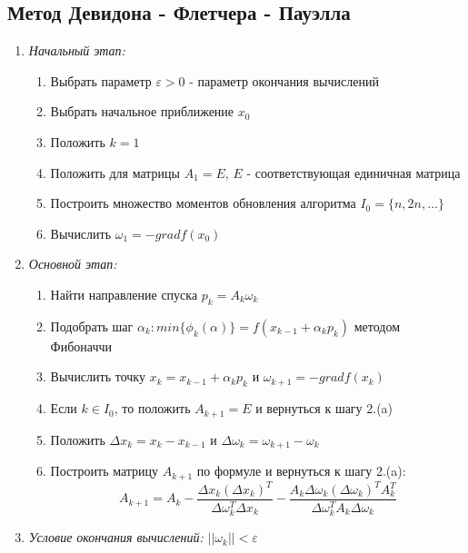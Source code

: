 \documentclass[../body.tex]{subfiles}
\begin{document}
\subsection{Метод Девидона - Флетчера - Пауэлла}
\begin{enumerate}
    \item \textit{Начальный этап:}
        \begin{enumerate}
            \item Выбрать параметр $\varepsilon>0$ - параметр окончания вычислений
            \item Выбрать начальное приближение $x_0$
            \item Положить $k=1$
            \item Положить для матрицы $A_1=E$, $E$ - соответствующая единичная матрица
            \item Построить множество моментов обновления алгоритма $I_0=\{n,2n,...\}$
            \item Вычислить $\omega_1=-grad f(x_0)$
        \end{enumerate}
    \item \textit{Основной этап:}
        \begin{enumerate}
            \item Найти направление спуска $p_k=A_k\omega_k$
            \item Подобрать шаг $\alpha_k:min{\{\phi_k(\alpha)\}}=f(x_{k-1}+\alpha_k p_k)$ методом Фибоначчи
            \item Вычислить точку $x_k=x_{k-1}+\alpha_k p_k$ и $\omega_{k+1}=-grad f(x_k)$
            \item Если $k\in I_0$, то положить $A_{k+1}=E$ и вернуться к шагу 2.(a)
            \item Положить $\Delta x_k=x_k-x_{k-1}$ и $\Delta\omega_k=\omega_{k+1}-\omega_k$
            \item Построить матрицу $A_{k+1}$ по формуле и вернуться к шагу 2.(a):
                \begin{equation}
                    A_{k+1}=A_k-{\frac{\Delta x_k{(\Delta x_k)}^T}{\Delta\omega_k^T \Delta x_k}}-{\frac{A_k\Delta\omega_k{(\Delta\omega_k)}^TA_k^T}{\Delta\omega_k^T A_k\Delta\omega_k}}
                \end{equation}
        \end{enumerate}
    \item \textit{Условие окончания вычислений:} $||\omega_k||<\varepsilon$
\end{enumerate}
\end{document}
